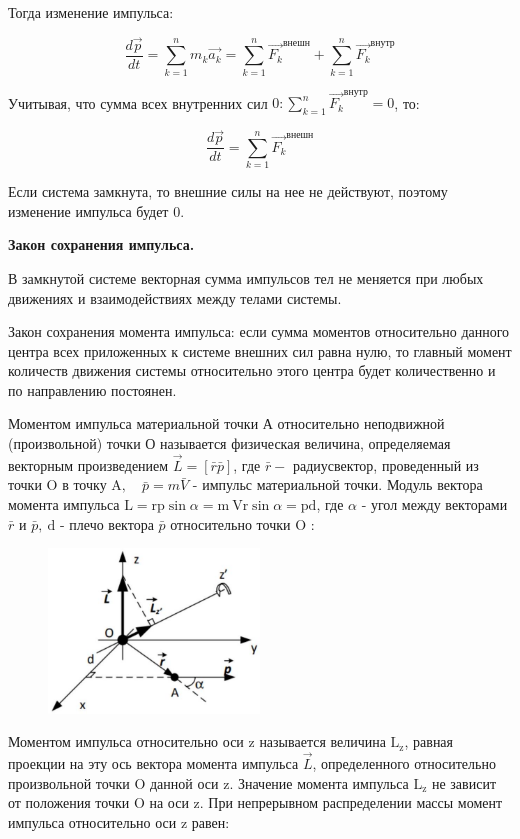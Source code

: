 Тогда изменение импульса:

$$
\frac{d \vec{p}}{d t}=\sum_{k=1}^{n} m_{k} \vec{a_{k}}=\sum_{k=1}^{n} \Vec{F_{k}}^{\text{внешн}}+\sum_{k=1}^{n} \vec{F_{k}}^{\text{внутр}}
$$

Учитывая, что сумма всех внутренних сил $0: \sum_{k=1}^{n} \vec{F_{k}}^{\text{внутр}}=0$, то:

$$
\frac{d \vec{p}}{d t}=\sum_{k=1}^{n} \Vec{F_{k}}^{\text{внешн}}
$$

Если система замкнута, то внешние силы на нее не действуют, поэтому изменение импульса будет 0.

\textbf{Закон сохранения импульса.} 

В замкнутой системе векторная сумма импульсов тел не меняется при любых движениях и взаимодействиях между телами системы.

Закон сохранения момента импульса: если сумма моментов относительно данного центра всех приложенных к системе внешних сил равна нулю, то главный момент количеств движения системы относительно этого центра будет количественно и по направлению постоянен.


Моментом импульса материальной точки А относительно неподвижной (произвольной) точки О называется физическая величина, определяемая векторным произведением $\vec{L}=[\bar{r} \bar{p}]$, где $\bar{r}-$ радиусвектор, проведенный из точки $\mathrm{O}$ в точку $\mathrm{A}, \quad \bar{p}=m \bar{V}$ - импульс материальной точки. Модуль вектора момента импульса $\mathrm{L}=\mathrm{r} \mathrm{p} \sin \alpha=\mathrm{m} \mathrm{~V}\mathrm{r} \sin \alpha=\mathrm{p}  \mathrm{d}$, где $\alpha$ - угол между векторами $\bar{r}$ и $\bar{p}, \mathrm{~d}$ - плечо вектора $\bar{p}$ относительно точки $\mathrm{O}$ :

\begin{figure}[h!]
    \centering
    \includegraphics[width=0.5\textwidth]{2023_05_21_6e9b4e8657e82b213c6ag-03}
\end{figure}

Моментом импульса относительно оси z называется величина $\mathrm{L}_{\mathrm{z}}$, равная проекции на эту ось вектора момента импульса $\vec{L}$, определенного относительно произвольной точки O данной оси z. Значение момента импульса $\mathrm{L}_{\mathrm{z}}$ не зависит от положения точки $\mathrm{O}$ на оси z. При непрерывном распределении массы момент импульса относительно оси z равен:

